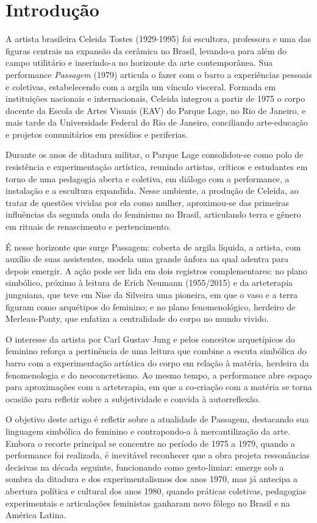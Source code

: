 \section*{Introdução}
A artista brasileira Celeida Tostes (1929-1995) foi escultora, professora e uma das figuras centrais na expansão da cerâmica no Brasil, levando-a para além do campo utilitário e inserindo-a no horizonte da arte contemporânea. Sua performance \emph{Passagem} (1979) articula o fazer com o barro a experiências pessoais e coletivas, estabelecendo com a argila um vínculo visceral. Formada em instituições nacionais e internacionais, Celeida integrou a partir de 1975 o corpo docente da Escola de Artes Visuais (EAV) do Parque Lage, no Rio de Janeiro, e mais tarde da Universidade Federal do Rio de Janeiro, conciliando arte-educação e projetos comunitários em presídios e periferias.

Durante os anos de ditadura militar, o Parque Lage consolidou-se como polo de resistência e experimentação artística, reunindo artistas, críticos e estudantes em torno de uma pedagogia aberta e coletiva, em diálogo com a performance, a instalação e a escultura expandida. Nesse ambiente, a produção de Celeida, ao tratar de questões vividas por ela como mulher, aproximou-se das primeiras influências da segunda onda do feminismo no Brasil, articulando terra e gênero em rituais de renascimento e pertencimento.

É nesse horizonte que surge Passagem: coberta de argila líquida, a artista, com auxílio de suas assistentes, modela uma grande ânfora na qual adentra para depois emergir. A ação pode ser lida em dois registros complementares: no plano simbólico, próximo à leitura de Erich Neumann (1955/2015) e da arteterapia junguiana, que teve em Nise da Silveira uma pioneira, em que o vaso e a terra figuram como arquétipos do feminino; e no plano fenomenológico, herdeiro de Merleau-Ponty, que enfatiza a centralidade do corpo no mundo vivido.

O interesse da artista por Carl Gustav Jung e pelos conceitos arquetípicos do feminino reforça a pertinência de uma leitura que combine a escuta simbólica do barro com a experimentação artística do corpo em relação à matéria, herdeira da fenomenologia e do neoconcretismo. Ao mesmo tempo, a performance abre espaço para aproximações com a arteterapia, em que a co-criação com a matéria se torna ocasião para refletir sobre a subjetividade e convida à autorreflexão.

O objetivo deste artigo é refletir sobre a atualidade de Passagem, destacando sua linguagem simbólica do feminino e contrapondo-a à mercantilização da arte. Embora o recorte principal se concentre no período de 1975 a 1979, quando a performance foi realizada, é inevitável reconhecer que a obra projeta ressonâncias decisivas na década seguinte, funcionando como gesto-limiar: emerge sob a sombra da ditadura e dos experimentalismos dos anos 1970, mas já antecipa a abertura política e cultural dos anos 1980, quando práticas coletivas, pedagogias experimentais e articulações feministas ganharam novo fôlego no Brasil e na América Latina.

